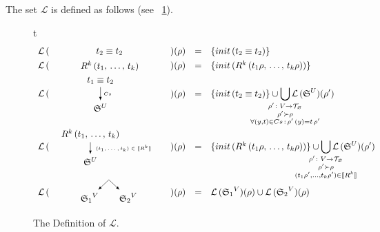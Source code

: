 \begin{definition}
The set $\mathcal{L}$ is defined as follows (see \figureword~\ref{l-def}).

\begin{figure}{t}
\[
\begin{array}{rclcl}
 \mathcal{L}\,(&\parbox[m]{1.3cm}{\schemenode{$\unigoal{t_2}{t_2}$}}&)(\rho) &=& \{init\,(\unigoal{t_2}{t_2})\} \\
 \mathcal{L}\,(&\parbox[m]{2.5cm}{\schemenode{$\invokegoal{R^k}{t_1}{t_k}$}}&)(\rho) &=& \{init\,(\invokegoal{R^k}{t_1 \rho}{t_k \rho})\} \\
 \mathcal{L}\,(&\parbox[m]{2cm}{\schemesarrow{$\unigoal{t_1}{t_2}$}{$Cs$}{$\schemewithvset{\mathfrak{S}}{U}$}} &)(\rho) &=&  \{init\,(\unigoal{t_2}{t_2})\} \cup
      \smashoperator{\bigcup\limits_{\substack{ \rho' \colon V \to \grterms \\
                                      \rho' \succ \rho \\
                                      \forall (y, t) \in Cs\,:\, \rho'\,(y) = t\, \rho'  }}}
           \mathcal{L}\,(\schemewithvset{\mathfrak{S}}{U})(\rho')  \\
 \mathcal{L}\,(& \parbox[m]{4cm}{\schemedarrow{$\invokegoal{R^k}{t_1}{t_k}$}{ $(t_1, \dots, t_k) \in \sembr{R^k}  $}{$\schemewithvset{\mathfrak{S}}{U}$}} &)(\rho) &=&
      \{init\,(\invokegoal{R^k}{t_1 \rho}{t_k \rho})\} \cup
      \smashoperator{\bigcup\limits_{\substack{ \rho' \colon V \to \grterms \\
                                      \rho' \succ \rho \\
                                      (t_1 \rho', \dots, t_k \rho') \in \sembr{R^k}  }}}
           \mathcal{L}\,(\schemewithvset{\mathfrak{S}}{U})(\rho')  \\
 \mathcal{L}\,(&\parbox[m]{2.5cm}{\schemefork{$\schemewithvset{\mathfrak{S}_1}{V}$}{$\schemewithvset{\mathfrak{S}_2}{V}$}}&)(\rho) &=&
 \mathcal{L}\,(\schemewithvset{\mathfrak{S}_1}{V})(\rho) \cup \mathcal{L}\,(\schemewithvset{\mathfrak{S}_2}{V})(\rho)
\end{array}
\]
\caption{The Definition of $\mathcal{L}$.}
\label{l-def}
\end{figure}
\end{definition}


